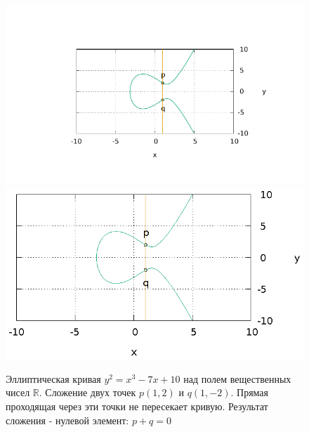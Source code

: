 \begin{figure}
\centering
\ifpdf
\includegraphics[angle=0,scale=1.5]
{./add/discretmath/picellipticsumeq.pdf}
\else
\includegraphics[angle=0,scale=1.5]
{./add/discretmath/picellipticsumeq.eps}
\fi
\caption{Эллиптическая кривая $y^2 = x^3 -7 x + 10$ над полем
  вещественных чисел $\mathbb{R}$. Сложение двух точек $p(1,2)$ и
  $q(1,-2)$. Прямая проходящая через эти точки не пересекает кривую.
  Результат сложения - нулевой элемент: $p + q = 0$}
\label{fig:add:ellipticRsumEq}
\end{figure}
